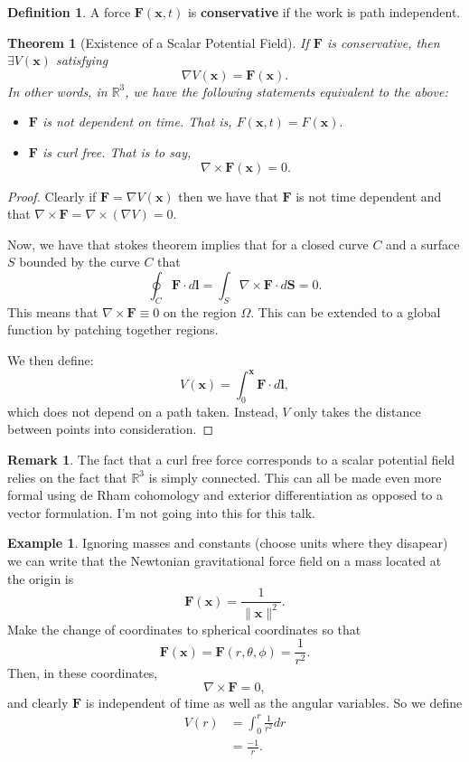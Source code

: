 \documentclass[12pt]{article}
\newcommand{\R}{\mathbb{R}}
\newtheorem{theorem}{Theorem}[part]
\theoremstyle{definition}
\newtheorem{definition}{Definition}[part]
\newtheorem{example}{Example}[part]
\newtheorem{remark}{Remark}[part]
\begin{document}
\begin{definition}
A force $\mathbf{F}(\mathbf{x},t)$ is \textbf{conservative} if the work is path independent.
\end{definition}

\begin{theorem}[Existence of a Scalar Potential Field]
If $\mathbf{F}$ is conservative, then $\exists V(\mathbf{x})$ satisfying 
\[
\nabla V(\mathbf{x})=\mathbf{F}(\mathbf{x}).
\]
In other words, in $\R^3$, we have the following statements equivalent to the above:
\begin{itemize}
    \item $\mathbf{F}$ is not dependent on time.  That is, $F(\mathbf{x},t)=F(\mathbf{x}).$
    \item $\mathbf{F}$ is \emph{curl free}. That is to say, 
    \[
    \nabla \times \mathbf{F}(\mathbf{x})=0.
    \]
\end{itemize}
\end{theorem}

\begin{proof}
Clearly if $\mathbf{F}=\nabla V(\mathbf{x})$ then we have that $\mathbf{F}$ is not time dependent and that $\nabla \times \mathbf{F}=\nabla \times (\nabla V)=0$.   

Now, we have that stokes theorem implies that for a closed curve $C$ and a surface $S$ bounded by the curve $C$ that
\[
\oint_C \mathbf{F}\cdot d\mathbf{l} = \int_S \nabla \times \mathbf{F}\cdot d\mathbf{S}=0.
\]
This means that $\nabla \times \mathbf{F}\equiv 0$ on the region $\Omega$. This can be extended to a global function by patching together regions.

We then define:
\[
V(\mathbf{x})=\int_0^\mathbf{x} \mathbf{F}\cdot d\mathbf{l},
\]
which does not depend on a path taken.  Instead, $V$ only takes the distance between points into consideration.
\end{proof}

\begin{remark}
The fact that a curl free force corresponds to a scalar potential field relies on the fact that $\R^3$ is simply connected.  This can all be made even more formal using de Rham cohomology and exterior differentiation as opposed to a vector formulation. I'm not going into this for this talk.
\end{remark}

\begin{example}
Ignoring masses and constants (choose units where they disapear) we can write that the Newtonian gravitational force field on a mass located at the origin is 
\[
\mathbf{F}(\mathbf{x})=\frac{1}{\|\mathbf{x}\|^2}.
\]
Make the change of coordinates to spherical coordinates so that
\[
\mathbf{F}(\mathbf{x})=\mathbf{F}(r, \theta, \phi)=\frac{1}{r^2}.
\]
Then, in these coordinates, 
\[
\nabla \times \mathbf{F}=0,
\]
and clearly $\mathbf{F}$ is independent of time as well as the angular variables.  So we define
\begin{align*}
V(r)&=\int_0^r \frac{1}{r^2}dr\\
&= \frac{-1}{r}.
\end{align*}
\end{example}
\end{document}
